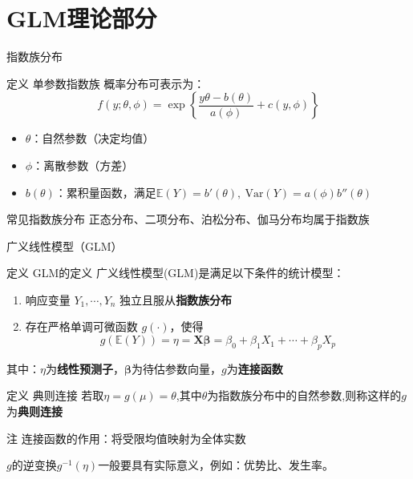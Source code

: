 \documentclass[aspectratio=169]{beamer}
\begin{document}
\section{GLM理论部分}

\begin{frame}{指数族分布}
\begin{block}{定义 单参数指数族}
概率分布可表示为：
\[ f(y;\theta,\phi)=\exp\left\{\frac{y\theta-b(\theta)}{a(\phi)}+c(y,\phi)\right\} \]
\begin{itemize}
\item $\theta$：自然参数（决定均值）
\item $\phi$：离散参数（方差）
\item $b(\theta)$：累积量函数，满足$\mathbb{E}(Y)=b'(\theta),\ \text{Var}(Y)=a(\phi)b''(\theta)$
\end{itemize}
\end{block}
\begin{block}{常见指数族分布}
正态分布、二项分布、泊松分布、伽马分布均属于指数族
\end{block}
\end{frame}

\begin{frame}{广义线性模型（GLM）}
\begin{block}{定义 GLM的定义}
广义线性模型(GLM)是满足以下条件的统计模型：
\begin{enumerate}
\item 响应变量 $Y_1,\cdots,Y_n$ 独立且服从\textbf{指数族分布}

\item 存在严格单调可微函数 $g(\cdot)$，使得
\[ g(\mathbb{E}(Y)) = \eta = \boldsymbol{X\beta} = \beta_0+\beta_1X_1+\cdots+\beta_pX_p \]
\end{enumerate}
其中：$\eta$为\textbf{线性预测子}，$\boldsymbol{\beta}$为待估参数向量，$g$为\textbf{连接函数}
\end{block}

\begin{block}{定义 典则连接}
若取$\eta = g(\mu) = \theta$,其中$\theta$为指数族分布中的自然参数,则称这样的$g$为\textbf{典则连接}
\end{block}
\begin{alertblock}{注}
连接函数的作用：将受限均值映射为全体实数

$g$的逆变换$g^{-1}(\eta)$一般要具有实际意义，例如：优势比、发生率。
\end{alertblock}
\end{frame}
\end{document}
